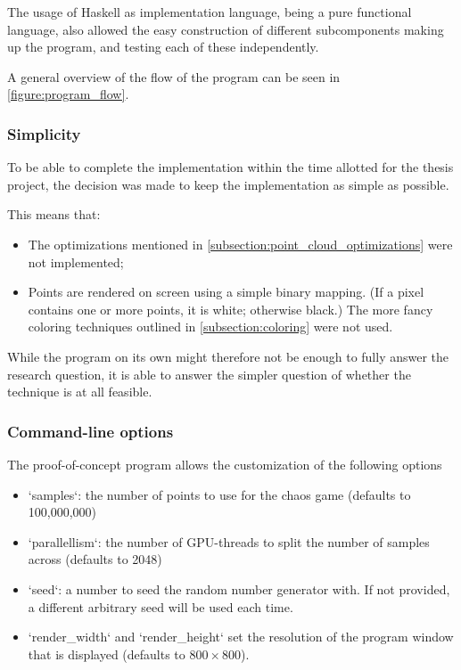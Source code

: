\documentclass[11pt]{article}
\begin{document}
The usage of Haskell as implementation language, being a pure functional language, also allowed 
the easy construction of different subcomponents making up the program,
and testing each of these independently.

A general overview of the flow of the program can be seen in \autoref{figure:program_flow}.

\subsubsection{Simplicity}
\label{sec:org69ad330}

To be able to complete the implementation within the time allotted for the thesis project,
the decision was made to keep the implementation as simple as possible.

This means that:

\begin{itemize}
\item The optimizations mentioned in \autoref{subsection:point_cloud_optimizations} were not implemented;
\item Points are rendered on screen using a simple binary mapping. (If a pixel contains one or more points, it is white; otherwise black.)
The more fancy coloring techniques outlined in \autoref{subsection:coloring} were not used.
\end{itemize}

While the program on its own might therefore not be enough to fully answer the research question,
it is able to answer the simpler question of whether the technique is at all feasible.

\subsubsection{Command-line options}
\label{sec:org41c7928}

The proof-of-concept program allows the customization of the following options

\begin{itemize}
\item `samples`: the number of points to use for the chaos game (defaults to 100,000,000)
\item `parallellism`: the number of GPU-threads to split the number of samples across (defaults to 2048)
\item `seed`: a number to seed the random number generator with. If not provided, a different arbitrary seed will be used each time.
\item `render\_width` and `render\_height` set the resolution of the program window that is displayed (defaults to \(800 \times 800\)).
\end{itemize}
\end{document}
